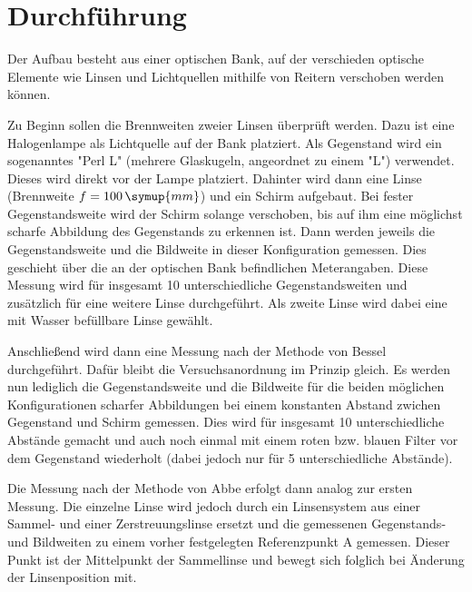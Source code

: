 \section{Durchführung}
\label{sec:Durchführung}
Der Aufbau besteht aus einer optischen Bank, auf
der verschieden optische Elemente wie Linsen und Lichtquellen mithilfe von Reitern
verschoben werden können.

Zu Beginn sollen die Brennweiten zweier Linsen überprüft werden. Dazu ist eine Halogenlampe als Lichtquelle auf
der Bank platziert. Als Gegenstand wird ein sogenanntes "Perl L" (mehrere Glaskugeln, angeordnet zu einem "L")
verwendet. Dieses wird direkt vor der Lampe platziert. Dahinter wird dann eine Linse (Brennweite $f = 100\,\symup{mm}$) und ein Schirm aufgebaut.
Bei fester Gegenstandsweite wird der Schirm solange verschoben, bis auf ihm eine möglichst scharfe Abbildung des
Gegenstands zu erkennen ist. Dann werden jeweils die Gegenstandsweite und die Bildweite in dieser Konfiguration
gemessen. Dies geschieht über die an der optischen Bank befindlichen Meterangaben. Diese Messung wird für insgesamt 10 unterschiedliche
Gegenstandsweiten und zusätzlich für eine weitere Linse durchgeführt. Als zweite Linse wird dabei eine mit Wasser befüllbare Linse
gewählt.

Anschließend wird dann eine Messung nach der Methode von Bessel durchgeführt. Dafür bleibt die Versuchsanordnung im
Prinzip gleich. Es werden nun lediglich die Gegenstandsweite und die Bildweite für die beiden möglichen Konfigurationen
scharfer Abbildungen bei einem konstanten Abstand zwichen Gegenstand und Schirm gemessen. Dies wird für insgesamt 10 unterschiedliche
Abstände gemacht und auch noch einmal mit einem roten bzw. blauen Filter vor dem Gegenstand wiederholt (dabei jedoch nur für 5 unterschiedliche
Abstände).

Die Messung nach der Methode von Abbe erfolgt dann analog zur ersten Messung. Die einzelne Linse wird jedoch durch ein Linsensystem aus einer
Sammel- und einer Zerstreuungslinse ersetzt und die gemessenen Gegenstands- und Bildweiten zu einem vorher festgelegten Referenzpunkt A gemessen.
Dieser Punkt ist der Mittelpunkt der Sammellinse und bewegt sich folglich bei Änderung der Linsenposition mit.
